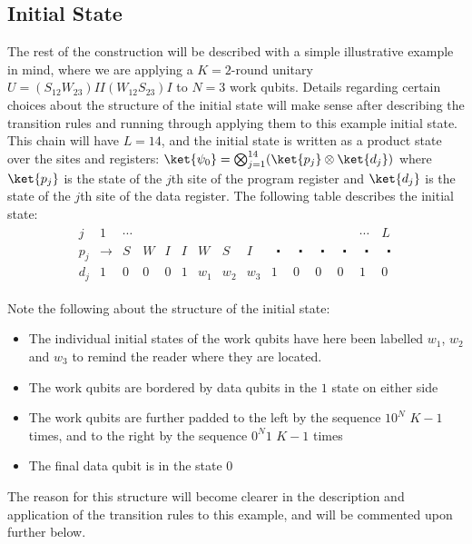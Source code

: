 \documentclass[11pt,letterpaper]{article}
\newcommand{\<}{\langle}
\renewcommand{\>}{\rangle}
\newcommand{\bul}{\:\:\centerdot\:}       %
\begin{document}
\subsection{Initial State}

The rest of the construction will be described with a simple illustrative example in mind, where we are applying a $K=2$-round unitary $U=(S_{12}W_{23})II(W_{12}S_{23})I$ to $N=3$ work qubits. Details regarding certain choices about the structure of the initial state will make sense after describing the transition rules and running through applying them to this example initial state. This chain will have $L=14$, and the initial state is written as a product state over the sites and registers: $\ket{\psi_0}=\bigotimes_{j=1}^{14}(\ket{p_j}\otimes\ket{d_j})$ where $\ket{p_j}$ is the state of the $j$th site of the program register and $\ket{d_j}$ is the state of the $j$th site of the data register. The following table describes the initial state:
\begin{eqnarray}
	\begin{array}{c|cccccccccccccc}
		     j & 1 & \cdots     &      &      &      &      & 
		&&&&&& \cdots & L\\
		\hline
		p_j & \rightarrow & S & W & I & I & W &
		S & I & \bul & 
		\bul & \bul & \bul & \bul & \bul 
		\\		
		d_j & 1    & 0    & 0    & 0    & 1    & 
		w_1  & w_2  & w_3  &
		1    & 0    & 0    & 0    & 1	& 0    
 	\end{array} \label{startstate}
\end{eqnarray}

Note the following about the structure of the initial state: 
\begin{itemize}
	\item The individual initial states of the work qubits have here been labelled $w_1$, $w_2$ and $w_3$ to remind the reader where they are located.
	\item The work qubits are bordered by data qubits in the $1$ state on either side
	\item The work qubits are further padded to the left by the sequence $10^N$ $K-1$ times, and to the right by the sequence $0^N1$ $K-1$ times
	\item The final data qubit is in the state $0$
\end{itemize}
The reason for this structure will become clearer in the description and application of the transition rules to this example, and will be commented upon further below.
\end{document}
